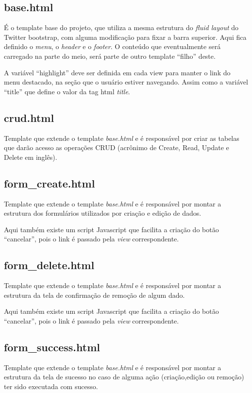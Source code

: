 \documentclass[letterpaper,10pt,brazil]{sphinxmanual}
\begin{document}
\subsection{base.html}
\label{templates:base-html}
É o template base do projeto, que utiliza a mesma estrutura do \emph{fluid layout} do Twitter bootstrap, com alguma modificação para fixar a barra superior. Aqui fica definido o \emph{menu}, o \emph{header} e o \emph{footer}. O conteúdo que eventualmente será carregado na parte do meio, será parte de outro template ``filho'' deste.

A variável ``highlight'' deve ser definida em cada view para manter o link do menu destacado, na seção que o usuário estiver navegando. Assim como a variável ``title'' que define o valor da tag html \emph{title}.


\subsection{crud.html}
\label{templates:crud-html}
Template que extende o template \emph{base.html} e é responsável por criar as tabelas que darão acesso as operações CRUD (acrônimo de Create, Read, Update e Delete em inglês).


\subsection{form\_create.html}
\label{templates:form-create-html}
Template que extende o template \emph{base.html} e é responsável por montar a estrutura dos formulários utilizados por criação e edição de dados.

Aqui também existe um script Javascript que facilita a criação do botão ``cancelar'', pois o link é passado pela \emph{view} correspondente.


\subsection{form\_delete.html}
\label{templates:form-delete-html}
Template que extende o template \emph{base.html} e é responsável por montar a estrutura da tela de confirmação de remoção de algum dado.

Aqui também existe um script Javascript que facilita a criação do botão ``cancelar'', pois o link é passado pela \emph{view} correspondente.


\subsection{form\_success.html}
\label{templates:form-success-html}
Template que extende o template \emph{base.html} e é responsável por montar a estrutura da tela de sucesso no caso de alguma ação (criação,edição ou remoção) ter sido executada com sucesso.
\end{document}
